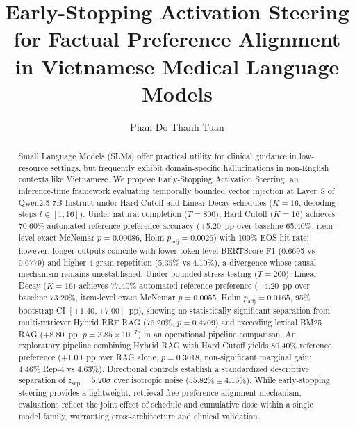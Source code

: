 \documentclass[runningheads]{llncs}
\begin{document}
\pagestyle{empty}

\title{Early-Stopping Activation Steering for Factual Preference Alignment in Vietnamese Medical Language Models}

\author{Phan Do Thanh Tuan}


\maketitle

\begin{abstract}
Small Language Models (SLMs) offer practical utility for clinical guidance in low-resource settings, but frequently exhibit domain-specific hallucinations in non-English contexts like Vietnamese. We propose Early-Stopping Activation Steering, an inference-time framework evaluating temporally bounded vector injection at Layer~8 of Qwen2.5-7B-Instruct under Hard Cutoff and Linear Decay schedules ($K{=}16$, decoding steps $t \in [1, 16]$). Under natural completion ($T=800$), Hard Cutoff ($K{=}16$) achieves 70.60\% automated reference-preference accuracy (+5.20~pp over baseline 65.40\%, item-level exact McNemar $p=0.00086$, Holm $p_{\text{adj}}=0.0026$) with 100\% EOS hit rate; however, longer outputs coincide with lower token-level BERTScore F1 (0.6695 vs 0.6779) and higher 4-gram repetition (5.35\% vs 4.10\%), a divergence whose causal mechanism remains unestablished. Under bounded stress testing ($T=200$), Linear Decay ($K{=}16$) achieves 77.40\% automated reference preference (+4.20~pp over baseline 73.20\%, item-level exact McNemar $p=0.0055$, Holm $p_{\text{adj}}=0.0165$, 95\% bootstrap CI $[+1.40, +7.00]$~pp), showing no statistically significant separation from multi-retriever Hybrid RRF RAG (76.20\%, $p=0.4709$) and exceeding lexical BM25 RAG (+8.80~pp, $p=3.85 \times 10^{-7}$) in an operational pipeline comparison. An exploratory pipeline combining Hybrid RAG with Hard Cutoff yields 80.40\% reference preference (+1.00~pp over RAG alone, $p=0.3018$, non-significant marginal gain; 4.46\% Rep-4 vs 4.63\%). Directional controls establish a standardized descriptive separation of $z_{\text{sep}}=5.20\sigma$ over isotropic noise ($55.82\% \pm 4.15\%$). While early-stopping steering provides a lightweight, retrieval-free preference alignment mechanism, evaluations reflect the joint effect of schedule and cumulative dose within a single model family, warranting cross-architecture and clinical validation.

\end{abstract}
\end{document}
